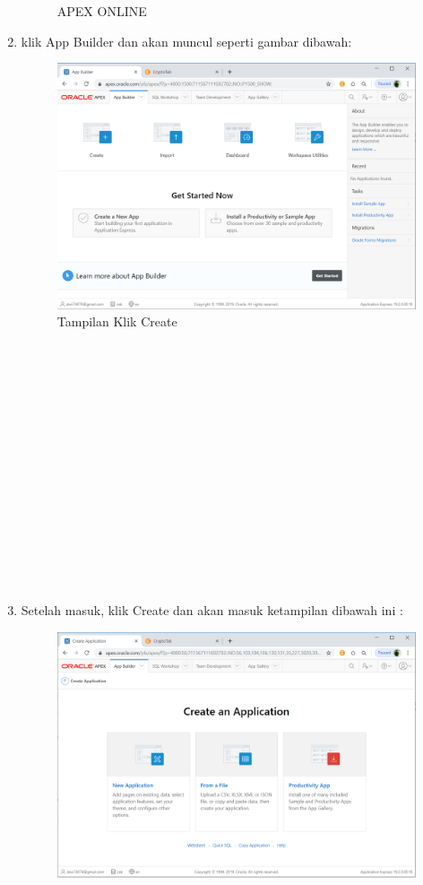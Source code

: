 \documentclass{article}
\begin{document}
\begin{enumerate}
\begin{figure}[h]
		\caption{APEX ONLINE}
\end{figure}
	\item klik App Builder dan akan muncul seperti gambar dibawah:
	 \begin{figure}[h]
	\centering
		\includegraphics[scale=0.5]{gambar/3.PNG}
		\caption{Tampilan Klik Create}
\end{figure}
\\
\\
\\
\\
\\
\\
\\
\\
\\
\\
\\
\\
\\
\\
	\item Setelah masuk, klik Create dan akan masuk ketampilan dibawah ini :
	 \begin{figure}[h]
	\centering
		\includegraphics[scale=0.5]{gambar/4.PNG}

\end{figure}
\end{enumerate}
\end{document}
